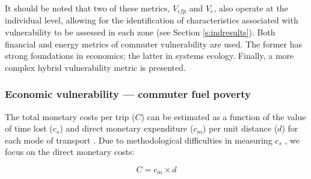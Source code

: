 It should be noted that two of these metrics, $V_{cfp}$ and $V_e$, also
operate at the individual level, allowing for the identification of
characteristics associated with vulnerability to be assessed in each zone
(see Section \ref{s:indresults}).
Both financial and energy metrics of commuter vulnerability are
used. The former has strong foundations in economics; the latter in systems
ecology. Finally, a more complex hybrid vulnerability metric is presented.

\subsubsection{Economic vulnerability --- commuter fuel poverty}
The total monetary costs per trip ($C$) can be estimated as a function of the
value of time lost ($c_s$) and direct monetary expenditure ($c_m$) per unit
distance ($d$) for each mode of transport \citep{Ommeren2006}. Due to
methodological difficulties in measuring $c_s$ \citep{Mokhtarian2001}, we
focus on the direct monetary costs:

\begin{equation}
 C = c_m \times d
\end{equation}

